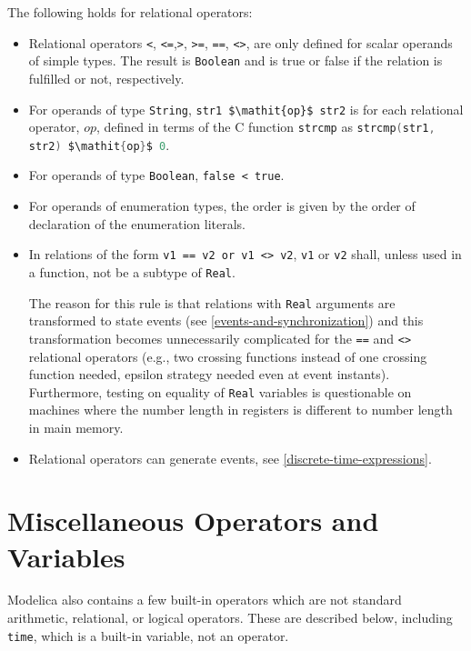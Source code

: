 The following holds for relational operators:
\begin{itemize}
\item
  Relational operators \lstinline!<!, \lstinline!<=!,\lstinline!>!, \lstinline!>=!, \lstinline!==!, \lstinline!<>!, are only defined for scalar operands of simple types.
  The result is \lstinline!Boolean! and is true or false if the relation is fulfilled or not, respectively.
\item
  For operands of type \lstinline!String!, \lstinline!str1 $\mathit{op}$ str2! is for each relational operator, $\mathit{op}$, defined in terms of the C function \lstinline[language=C]!strcmp! as \lstinline[language=C]!strcmp(str1, str2) $\mathit{op}$ 0!.
\item
  For operands of type \lstinline!Boolean!, \lstinline!false < true!.
\item
  For operands of enumeration types, the order is given by the order of declaration of the enumeration literals.
\item
  In relations of the form \lstinline!v1 == v2 or v1 <> v2!, \lstinline!v1! or \lstinline!v2! shall, unless used in a function, not be a subtype of \lstinline!Real!.
  \begin{nonnormative}
  The reason for this rule is that relations with \lstinline!Real! arguments are transformed to state events (see \cref{events-and-synchronization}) and this transformation becomes unnecessarily complicated for the \lstinline!==! and \lstinline!<>! relational operators (e.g., two crossing functions instead of one crossing function needed, epsilon strategy needed even at event instants).
  Furthermore, testing on equality of \lstinline!Real! variables is questionable on machines where the number length in registers is different to number length in main memory.
  \end{nonnormative}
\item
  Relational operators can generate events, see \cref{discrete-time-expressions}.
\end{itemize}

\section{Miscellaneous Operators and Variables}\label{miscellaneous-operators-and-variables}

Modelica also contains a few built-in operators which are not standard arithmetic, relational, or logical operators.
These are described below, including \lstinline!time!, which is a built-in variable, not an operator.

